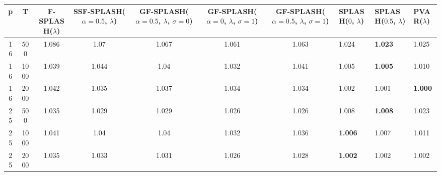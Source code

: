 \begin{tabular}{ccccccclll}
\hline
  p  &  T   &  F-SPLASH($\lambda$)  &  SSF-SPLASH($\alpha=0.5$, $\lambda$)  &  GF-SPLASH($\alpha=0.5$, $\lambda$, $\sigma=0$)  &  GF-SPLASH($\alpha=0$, $\lambda$, $\sigma=1$)  &  GF-SPLASH($\alpha=0.5$, $\lambda$, $\sigma=1$)  & SPLASH($0$, $\lambda$)   & SPLASH($0.5$, $\lambda$)   & PVAR($\lambda$)   \\
\hline
 16  & 500  &         1.086         &                 1.07                  &                      1.067                       &                     1.061                      &                      1.063                       & 1.024                    & \textbf{1.023}             & 1.025             \\
 16  & 1000 &         1.039         &                 1.044                 &                       1.04                       &                     1.032                      &                      1.041                       & 1.005                    & \textbf{1.005}             & 1.010             \\
 16  & 2000 &         1.042         &                 1.035                 &                      1.037                       &                     1.034                      &                      1.034                       & 1.002                    & 1.001                      & \textbf{1.000}    \\
 25  & 500  &         1.035         &                 1.029                 &                      1.029                       &                     1.026                      &                      1.026                       & 1.008                    & \textbf{1.008}             & 1.023             \\
 25  & 1000 &         1.041         &                 1.04                  &                       1.04                       &                     1.032                      &                      1.036                       & \textbf{1.006}           & 1.007                      & 1.011             \\
 25  & 2000 &         1.035         &                 1.033                 &                      1.031                       &                     1.026                      &                      1.028                       & \textbf{1.002}           & 1.002                      & 1.002             \\
\hline
\end{tabular}
